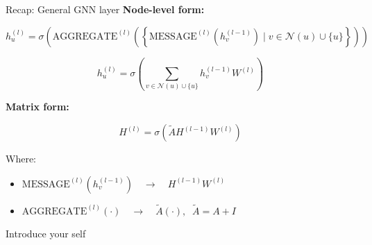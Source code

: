 \documentclass[aspectratio=169]{beamer}
\renewcommand{\alert}[1]{\textbf{\color{swufe}#1}}
\begin{document}
        \begin{frame}{Recap: General GNN layer}
            \alert{Node-level form:}

            \begin{equation}
                h_{u}^{(l)} = \sigma\!\left(\text{AGGREGATE}^{(l)}\!\left(\left\{\text{MESSAGE}^{(l)}\left(h_v^{(l-1)}\right) \mid v \in \mathcal{N} (u) \cup \{u\}\right\}\right)\right)
            \end{equation}

            \begin{equation}
                h_{u}^{(l)} = \sigma\!\left(\sum_{v \in \mathcal{N}(u) \cup \{u\}}h_v^{(l-1)}W^{(l)}\right)
            \end{equation}

            \alert{Matrix form:}

            \begin{equation}
                H^{(l)} = \sigma\left(\tilde{A}H^{(l-1)} W^{(l)}\right)
            \end{equation}

            Where:
            \begin{itemize}
                \item $\text{MESSAGE}^{(l)}\left(h_v^{(l-1)}\right) \quad \longrightarrow \quad H^{(l-1)}W^{(l)}$
                \item $\text{AGGREGATE}^{(l)}(\cdot) \quad \longrightarrow \quad \tilde{A}(\cdot), \;\; \tilde{A} = A + I$
            \end{itemize}

            \begin{note}
                {Introduce your self}
            \end{note}
        \end{frame}
\end{document}
